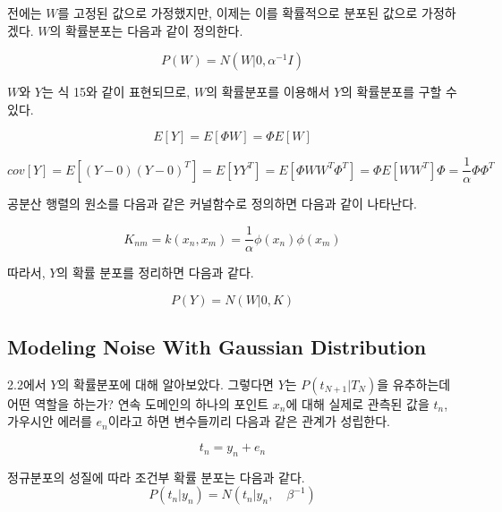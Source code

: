 \documentclass[a4paper]{oblivoir}
\begin{document}
전에는 $W$를 고정된 값으로 가정했지만, 이제는 이를 확률적으로 분포된 값으로 가정하겠다. $W$의 확률분포는 다음과 같이 정의한다. 

\begin{equation}
P(W) =N(W|0,\alpha^{-1}I)
\label{eq:12-16}
\end{equation} 

$W$와 $Y$는 식 15와 같이 표현되므로, $W$의 확률분포를 이용해서 $Y$의 확률분포를 구할 수 있다.

\begin{equation}
E[Y] = E[\Phi W] = \Phi E[W]
\label{eq:12-17}
\end{equation} 

\begin{equation}
cov[Y] = E[(Y -0)(Y -0)^{T}] =E[YY^{T}] = E[\Phi W W^{T} \Phi^{T}]= \Phi E[WW^{T}] \Phi  = \frac{1}{\alpha}\Phi \Phi^{T}
\label{eq:12-18}
\end{equation} 

공분산 행렬의 원소를 다음과 같은 커널함수로 정의하면 다음과 같이 나타난다.

\begin{equation}
K_{nm} = k(x_{n}, x_{m}) = \frac{1}{\alpha}\phi(x_{n}) \phi(x_{m} )
\label{eq:12-19}
\end{equation} 

따라서, $Y$의 확률 분포를 정리하면 다음과 같다.

\begin{equation}
P(Y) =N(W|0,K)
\label{eq:12-20}
\end{equation} 

\subsection{Modeling Noise With Gaussian Distribution}

2.2에서 $Y$의 확률분포에 대해 알아보았다. 그렇다면 $Y$는 $P(t_{N+1}|T_{N})$을 유추하는데 어떤 역할을 하는가? 연속 도메인의 하나의 포인트 $x_{n}$에 대해 실제로 관측된 값을 $t_{n}$, 가우시안 에러를 $e_{n}$이라고 하면 변수들끼리 다음과 같은 관계가 성립한다.

\begin{equation}
t_{n} = y_{n} +e_{n}
\label{eq:12-21}
\end{equation} 

정규분포의 성질에 따라 조건부 확률 분포는 다음과 같다.\\ 
\begin{equation}
P(t_{n} | y_{n}) =N(t_{n} | y_{n}, \quad \beta^{-1})
\label{eq:12-22}
\end{equation} 
\end{document}
